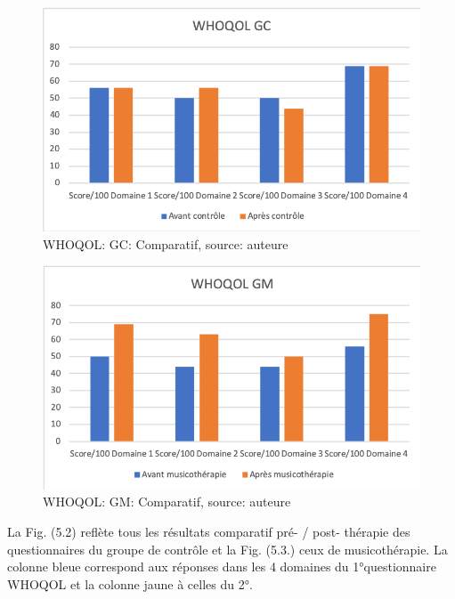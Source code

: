  
 
 
 
 
 
 
 
 \begin{figure} [th]
 	\centering
 	\includegraphics[width=0.7\linewidth]{images/Compcontrole.png}
 	\caption[WHOQOL:  GC: Comparatif entre les 2 questionnaires]{WHOQOL:  GC: Comparatif, source: 
 	auteure}
 	
 \end{figure}
 
 \begin{figure}[th]
 	\centering
 	\includegraphics[width=0.7\linewidth]{images/Compmusico.png}
 	\caption[WHOQOL: GM: Comparatif entre les 2 questionnaires]{ WHOQOL: GM: Comparatif, source: 
 	auteure}
 	
 \end{figure}
 La  Fig. (5.2) reflète tous les résultats comparatif pré- / post- thé\-ra\-pie des questionnaires
 du groupe de contrôle  et la  Fig. (5.3.) ceux de musicothérapie.
  La colonne bleue correspond aux réponses dans les 4 domaines du 
 1°questionnaire WHOQOL et la 
 colonne jaune à celles du 2°.
  
